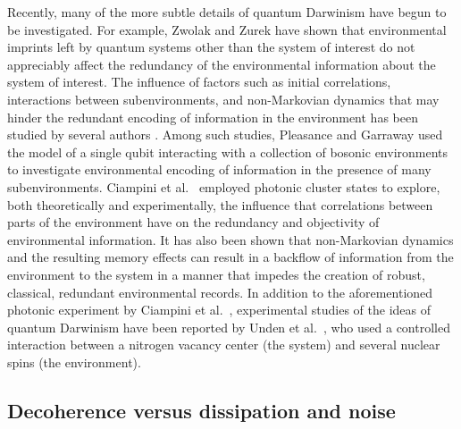 \documentclass[3p,sort&compress]{elsarticle}
\begin{document}
Recently, many of the more subtle details of quantum Darwinism have begun to be investigated. For example, Zwolak and Zurek \cite{Zwolak:2017:mm} have shown that environmental imprints left by quantum systems other than the system of interest do not appreciably affect the redundancy of the environmental information about the system of interest. The influence of factors such as initial correlations, interactions between subenvironments, and non-Markovian dynamics that may hinder the redundant encoding of information in the environment has been studied by several authors \cite{Riedel:2012:un,Galve:2016:oo, Pleasance:2017:oo, Ciampini:2018:ii}. Among such studies, Pleasance and Garraway \cite{Pleasance:2017:oo} used the model of a single qubit interacting with a collection of bosonic environments to investigate environmental encoding of information in the presence of many subenvironments. Ciampini et al.\ \cite{Ciampini:2018:ii} employed photonic cluster states to explore, both theoretically and experimentally, the influence that correlations between parts of the environment have on the redundancy and objectivity of environmental information. It has also been shown \cite{Galve:2016:oo, Pleasance:2017:oo, Ciampini:2018:ii} that non-Markovian dynamics and the resulting memory effects can result in a backflow of information from the environment to the system in a manner that impedes the creation of robust, classical, redundant environmental records. In addition to the aforementioned photonic experiment by Ciampini et al.\ \cite{Ciampini:2018:ii}, experimental studies of the ideas of quantum Darwinism have been reported by Unden et al.\ \cite{Unden:2018:ia}, who used a controlled interaction between a nitrogen vacancy center (the system) and several nuclear spins (the environment). 

\subsection{\label{sec:decoh-vers-diss}Decoherence versus dissipation and noise}
\end{document}
